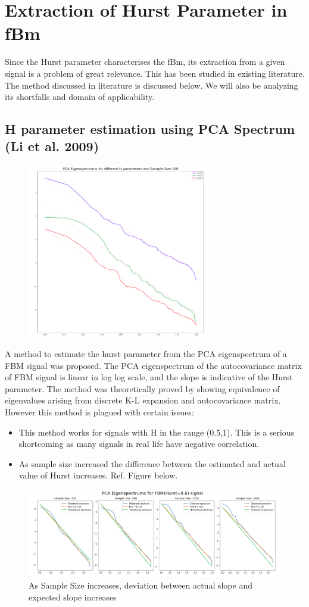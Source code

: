 \documentclass[a4paper]{article}
\begin{document}
\section{Extraction of Hurst Parameter in fBm}
Since the Hurst parameter characterises the fBm, its extraction from a given signal is a problem of great relevance. This has been studied in existing literature. The method discussed in literature is discussed below. We will also be analyzing its shortfalls and domain of applicability.

\subsection{H parameter estimation using PCA Spectrum (Li et al. 2009)}
\begin{figure}
\vspace{-15pt}
\includegraphics[width=8cm]{Li_1.png}
\end{figure} 
A method to estimate the hurst parameter from the PCA eigenspectrum of a FBM signal was proposed. The PCA eigenspectrum of the autocovariance matrix of FBM signal is linear in log log scale, and the slope is indicative of the Hurst parameter. The method was theoretically proved by showing equivalence of eigenvalues arising from discrete K-L expansion and autocovariance matrix. However this method is plagued with certain issues:
\begin{itemize}
\item This method works for signals with H in the range (0.5,1). This is a serious shortcoming as many signals in real life have negative correlation.
\item As sample size increased the difference between the estimated and actual value of Hurst increases. Ref. Figure below.
\end{itemize}
\begin{figure}[h]
\includegraphics[width=\textwidth]{Li_2.png}
\caption{As Sample Size increases, deviation between actual slope and expected slope increases}
\end{figure}
\end{document}
